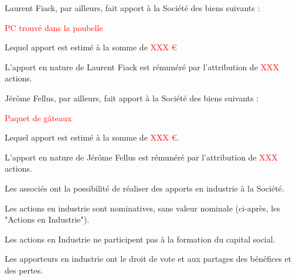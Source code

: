 \documentclass[a4paper,12pt]{report}
\begin{document}
Laurent Fiack, par ailleurs, fait apport à la Société des biens suivants :

\textcolor{red}{PC trouvé dans la poubelle}

Lequel apport est estimé à la somme de \textcolor{red}{XXX €}

L'apport en nature de Laurent Fiack est rémunéré par l'attribution de \textcolor{red}{XXX} actions.

Jérôme Fellus, par ailleurs, fait apport à la Société des biens suivants :

\textcolor{red}{Paquet de gâteaux}

Lequel apport est estimé à la somme de \textcolor{red}{XXX €}.

L'apport en nature de Jérôme Fellus est rémunéré par l'attribution de \textcolor{red}{XXX} actions.

Les associés ont la possibilité de réaliser des apports en industrie à la Société.

Les actions en industrie sont nominatives, sans valeur nominale (ci-après, les "Actions en Industrie").

Les actions en Industrie ne participent pas à la formation du capital social.

Les apporteurs en industrie ont le droit de vote et aux partages des bénéfices et des pertes.

%
\end{document}
